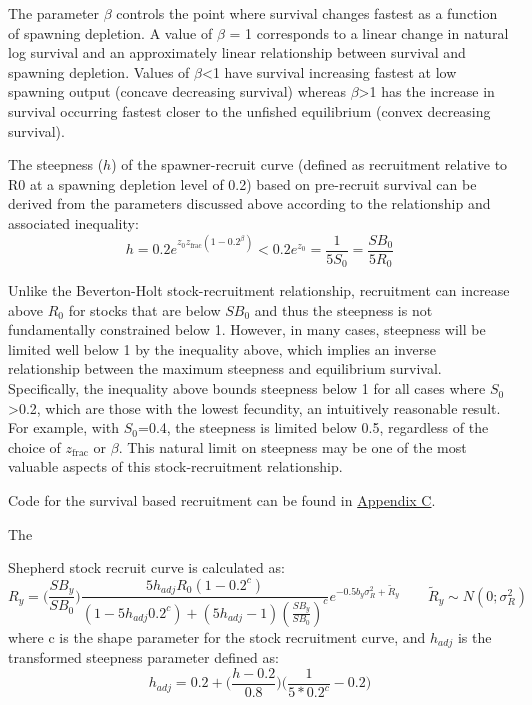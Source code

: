 The parameter $\beta$ controls the point where survival changes fastest as a function of spawning depletion. A value of $\beta$ = 1 corresponds to a linear change in natural log survival and an approximately linear relationship between survival and spawning depletion. Values of $\beta$<1 have survival increasing fastest at low spawning output (concave decreasing survival) whereas $\beta$>1 has the increase in survival occurring fastest closer to the unfished equilibrium (convex decreasing survival).  
	
The steepness ($h$) of the spawner-recruit curve (defined as recruitment relative to R0 at a spawning depletion level of 0.2) based on pre-recruit survival can be derived from the parameters discussed above according to the relationship and associated inequality:
	\begin{equation}
		h = 0.2e^{z_0z_{\text{frac}}(1-0.2^\beta)}<0.2e^{z_0}=\frac{1}{5S_0}=\frac{SB_0}{5R_0}
	\end{equation}
	
Unlike the Beverton-Holt stock-recruitment relationship, recruitment can increase above $R_0$ for stocks that are below $SB_0$ and thus the steepness is not fundamentally constrained below 1. However, in many cases, steepness will be limited well below 1 by the inequality above, which implies an inverse relationship between the maximum steepness and equilibrium survival. Specifically, the inequality above bounds steepness below 1 for all cases where $S_0$>0.2, which are those with the lowest fecundity, an intuitively reasonable result. For example, with $S_0$=0.4, the steepness is limited below 0.5, regardless of the choice of $z_{\text{frac}}$ or $\beta$. This natural limit on steepness may be one of the most valuable aspects of this stock-recruitment relationship.
	
Code for the survival based recruitment can be found in \hyperlink{AppendixC}{Appendix C}.

\hypertarget{Shepherd}{The} Shepherd stock recruit curve is calculated as:
	\begin{equation}
		R_y = \bigg(\frac{SB_y}{SB_0}\bigg)\frac{5h_{adj}R_0(1-0.2^c)}{(1-5h_{adj}0.2^c)+(5h_{adj}-1)(\frac{SB_y}{SB_0})^c}e^{-0.5b_y\sigma^2_R+\tilde{R}_y}\qquad \tilde{R}_y\sim N(0;\sigma^2_R)
	\end{equation}
where c is the shape parameter for the stock recruitment curve, and $h_{adj}$ is the transformed steepness parameter defined as:
	\begin{equation}
		h_{adj}=0.2+\bigg(\frac{h-0.2}{0.8}\bigg)\bigg(\frac{1}{5*0.2^c}-0.2\bigg)
	\end{equation}

